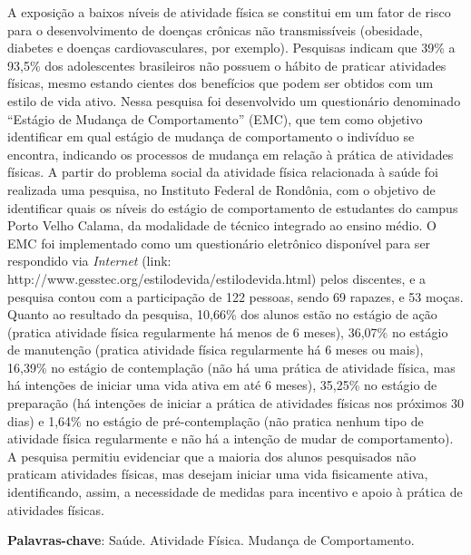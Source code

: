 \documentclass[article,12pt,onesidea,4paper,english,brazil]{abntex2}
\begin{document}
	\noindent A exposição a baixos níveis de atividade física se constitui em um fator de risco para
	o desenvolvimento de doenças crônicas não transmissíveis (obesidade, diabetes e
	doenças cardiovasculares, por exemplo). Pesquisas indicam que 39\% a 93,5\% dos
	adolescentes brasileiros não possuem o hábito de praticar atividades físicas, mesmo
	estando cientes dos benefícios que podem ser obtidos com um estilo de vida ativo.
	Nessa pesquisa foi desenvolvido um questionário denominado “Estágio de Mudança
	de Comportamento” (EMC), que tem como objetivo identificar em qual estágio de
	mudança de comportamento o indivíduo se encontra, indicando os processos de
	mudança em relação à prática de atividades físicas. A partir do problema social da
	atividade física relacionada à saúde foi realizada uma pesquisa, no Instituto Federal
	de Rondônia, com o objetivo de identificar quais os níveis do estágio de
	comportamento de estudantes do campus Porto Velho Calama, da modalidade de
	técnico integrado ao ensino médio. O EMC foi implementado como um questionário
	eletrônico disponível para ser respondido via \textit{Internet} (link:
	http://www.gesstec.org/estilodevida/estilodevida.html) pelos discentes, e a pesquisa
	contou com a participação de 122 pessoas, sendo 69 rapazes, e 53 moças. Quanto
	ao resultado da pesquisa, 10,66\% dos alunos estão no estágio de ação (pratica
	atividade física regularmente há menos de 6 meses), 36,07\% no estágio de
	manutenção (pratica atividade física regularmente há 6 meses ou mais), 16,39\% no
	estágio de contemplação (não há uma prática de atividade física, mas há intenções
	de iniciar uma vida ativa em até 6 meses), 35,25\% no estágio de preparação (há
	intenções de iniciar a prática de atividades físicas nos próximos 30 dias) e 1,64\% no
	estágio de pré-contemplação (não pratica nenhum tipo de atividade física
	regularmente e não há a intenção de mudar de comportamento). A pesquisa permitiu
	evidenciar que a maioria dos alunos pesquisados não praticam atividades físicas,
	mas desejam iniciar uma vida fisicamente ativa, identificando, assim, a necessidade
	de medidas para incentivo e apoio à prática de atividades físicas.
	
	\vspace{\onelineskip}
	
	\noindent
	\textbf{Palavras-chave}: Saúde. Atividade Física. Mudança de Comportamento.
	
\end{document}
